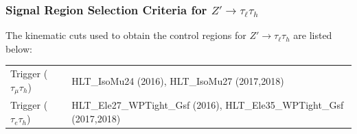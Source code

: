 \documentclass[8pt,xcolor=dvipsnames,xcolor=table]{beamer}
\begin{document}
\begin{frame}
\frametitle{Signal Region Selection Criteria for $Z'\rightarrow\tau_\ell\tau_h$}

The kinematic cuts used to obtain the control regions for $Z'\rightarrow\tau_\ell\tau_h$ are listed below:
\\
\medskip

\small
\begin{tabular}{ll}
\hline
Trigger ($\tau_{\mu}\tau_{h}$) & HLT\_IsoMu24 (2016),  HLT\_IsoMu27 (2017,2018) \\
Trigger ($\tau_{e}\tau_{h}$) & HLT\_Ele27\_WPTight\_Gsf (2016),  HLT\_Ele35\_WPTight\_Gsf (2017,2018)  \\
\hline
\end{tabular}
\begin{columns}
    \begin{column}{.6\textwidth}
\centering
{}
\end{column}
\end{columns}
\end{frame}
\end{document}

